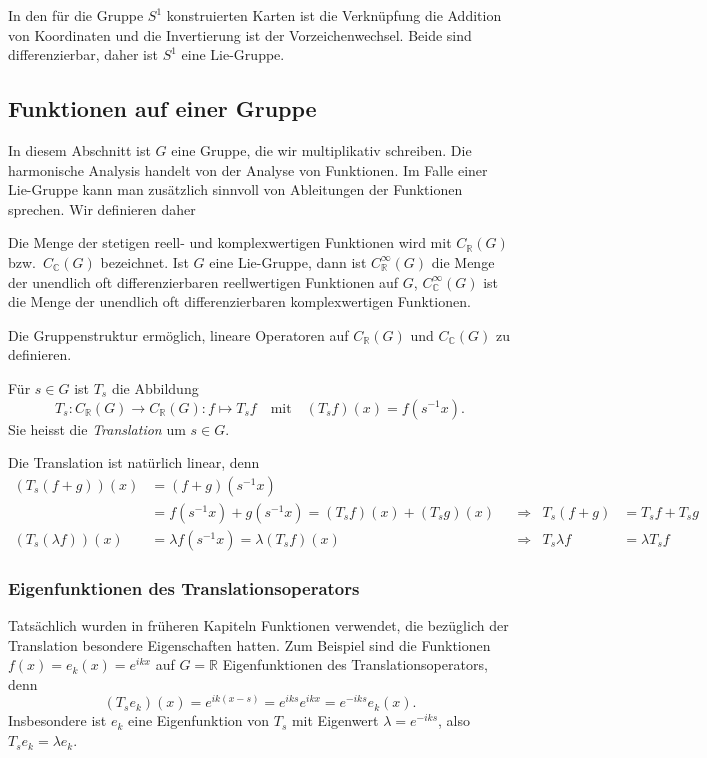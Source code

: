 In den für die Gruppe $S^1$ konstruierten Karten ist die Verknüpfung die
Addition von Koordinaten und die Invertierung ist der Vorzeichenwechsel.
Beide sind differenzierbar, daher ist $S^1$ eine Lie-Gruppe.

%
%
\subsection{Funktionen auf einer Gruppe
\label{buch:gruppen:subsection:funktionen}}
In diesem Abschnitt ist $G$ eine Gruppe, die wir multiplikativ
schreiben.
Die harmonische Analysis handelt von der Analyse von Funktionen.
Im Falle einer Lie-Gruppe kann man zusätzlich sinnvoll von Ableitungen
der Funktionen sprechen.
Wir definieren daher

\begin{definition}
\label{buch:gruppen:gruppe:def:funktionenaufgruppe}
Die Menge der stetigen reell- und komplexwertigen Funktionen wird mit
$C_{\mathbb{R}}(G)$ bzw.~$C_{\mathbb{C}}(G)$ bezeichnet.
Ist $G$ eine Lie-Gruppe, dann ist
$C_{\mathbb{R}}^\infty(G)$ die Menge der unendlich oft differenzierbaren
reellwertigen Funktionen auf $G$,
$C_{\mathbb{C}}^\infty(G)$ ist die Menge der unendlich oft differenzierbaren
komplexwertigen Funktionen.
\end{definition}

Die Gruppenstruktur ermöglich, lineare Operatoren auf $C_{\mathbb{R}}(G)$
und $C_{\mathbb{C}}(G)$ zu definieren.

\begin{definition}
\label{buch:gruppen:gruppe:def:translation}
Für $s\in G$ ist $T_s$ die Abbildung
\[
T_s
\colon
C_{\mathbb{R}}(G) \to C_{\mathbb{R}}(G)
:
f \mapsto T_sf
\quad
\text{mit}
\quad
(T_sf)(x) = f(s^{-1}x).
\]
Sie heisst die {\em Translation} um $s\in G$.
\end{definition}

Die Translation ist natürlich linear, denn
\begin{align*}
(T_s(f+g))(x)
&=
(f+g)(s^{-1}x)
\\
&=
f(s^{-1}x) + g(s^{-1}x)
=
(T_sf)(x) + (T_sg)(x)
&&\Rightarrow&
T_s(f+g)&=T_sf+T_sg
\\
(T_s(\lambda f))(x)
&=
\lambda f(s^{-1}x)
=
\lambda (T_sf)(x)
&&\Rightarrow&
T_s\lambda f
&=
\lambda T_sf
\end{align*}

%
%
\subsubsection{Eigenfunktionen des Translationsoperators}
Tatsächlich wurden in früheren Kapiteln Funktionen verwendet, die
bezüglich der Translation besondere Eigenschaften hatten.
Zum Beispiel sind die Funktionen $f(x)=e_k(x)=e^{ikx}$ auf $G=\mathbb{R}$
Eigenfunktionen des Translationsoperators, denn
\[
(T_se_k)(x)
=
e^{ik(x-s)}
=
e^{iks}e^{ikx}
=
e^{-iks} e_k(x).
\]
Insbesondere ist $e_k$ eine Eigenfunktion von $T_s$ mit Eigenwert
$\lambda=e^{-iks}$, also $T_se_k = \lambda e_k$.

